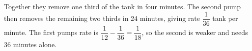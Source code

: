 Together they remove one third of the tank in four minutes. The second pump then removes the remaining two thirds in 24 minutes, giving rate $\dfrac{1}{36}$ tank per minute. The first pump\textquotesingle s rate is $\dfrac{1}{12}-\dfrac{1}{36}=\dfrac{1}{18}$, so the second is weaker and needs $\boxed{36}$ minutes alone.
